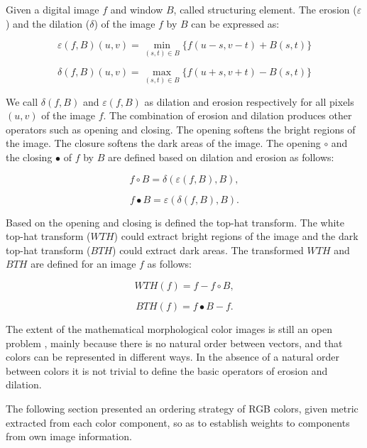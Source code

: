 Given a digital image $f$ and window $B$, called structuring element. The erosion ($\varepsilon$) and the dilation ($\delta$) of the image $f$ by $B$ can be expressed as:

\begin{equation}
\varepsilon(f,B)(u,v)  = \min_{(s,t) \in B} \{f(u-s,v-t) + B(s,t) \}
\end{equation}

\begin{equation}
\delta(f,B)(u,v)  =  \max_{(s,t) \in B} \{f(u+s,v+t) - B(s,t) \}
\end{equation}

We call $\delta(f,B)$ and $\varepsilon(f,B)$ as dilation and erosion respectively for all pixels $(u,v)$ of the image $f$. The combination of erosion and dilation produces other operators such as opening and closing. The opening softens the bright regions of the image. The closure softens the dark areas of the image. The opening $\circ$ and the closing $\bullet$ of $f$ by $B$ are defined based on dilation and erosion as follows:

\begin{equation}
f\circ B = \delta(\varepsilon(f,B),B),
\end{equation}

\begin{equation}
f\bullet B = \varepsilon(\delta(f,B),B).
\end{equation}

Based on the opening and closing is defined the top-hat transform. The white top-hat transform ($WTH$) could extract bright regions of the image and the dark top-hat transform ($BTH$) could extract dark areas. The transformed $WTH$ and $BTH$ are defined for an image $f$ as follows:

\begin{equation}
WTH(f) = f - f\circ B,
\end{equation}

\begin{equation}
BTH(f) = f\bullet B - f. 
\end{equation}

The extent of the mathematical morphological color images is still an open problem \cite{aptoula2007pseudo}, mainly because there is no natural order between vectors, and that colors can be represented in different ways. In the absence of a natural order between colors it is not trivial to define the basic operators of erosion and dilation.  

The following section presented  an ordering strategy of RGB colors, given metric extracted from each color component, so as to establish weights to components from own image information.

